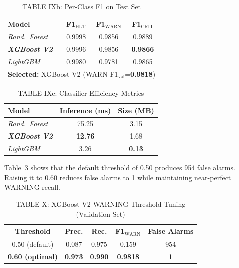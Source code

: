 \documentclass[conference]{IEEEtran}
\begin{document}
\begin{table}[htbp]
\caption{TABLE IXb: Per-Class F1 on Test Set}
\centering
\begin{tabular}{lccc}
\hline
\textbf{Model} & \textbf{F1$_\text{HLT}$} & \textbf{F1$_\text{WARN}$} & \textbf{F1$_\text{CRIT}$} \\
\hline
\textit{Rand.\ Forest}        & 0.9998 & 0.9856 & 0.9889 \\
\textbf{\textit{XGBoost V2}}  & 0.9996 & 0.9856 & \textbf{0.9866} \\
\textit{LightGBM}             & 0.9980 & 0.9781 & 0.9865 \\
\hline
\multicolumn{4}{l}{\textbf{Selected:} XGBoost V2 (WARN F1$_\text{val}$=\textbf{0.9818})} \\
\hline
\end{tabular}
\label{tab:clf_results_b}
\end{table}

\begin{table}[htbp]
\caption{TABLE IXc: Classifier Efficiency Metrics}
\centering
\begin{tabular}{lcc}
\hline
\textbf{Model} & \textbf{Inference (ms)} & \textbf{Size (MB)} \\
\hline
\textit{Rand.\ Forest}        & 75.25          & 3.15 \\
\textbf{\textit{XGBoost V2}}  & \textbf{12.76} & 1.68 \\
\textit{LightGBM}             & 3.26           & \textbf{0.13} \\
\hline
\end{tabular}
\label{tab:clf_results_c}
\end{table}

Table~\ref{tab:threshold} shows that the default threshold of 0.50 produces
954 false alarms. Raising it to 0.60 reduces false alarms to 1 while
maintaining near-perfect WARNING recall.

\begin{table}[htbp]
\caption{TABLE X: XGBoost V2 WARNING Threshold Tuning (Validation Set)}
\centering
\begin{tabular}{ccccc}
\hline
\textbf{Threshold} & \textbf{Prec.} & \textbf{Rec.} & \textbf{F1$_\text{WARN}$} & \textbf{False Alarms} \\
\hline
0.50 (default)          & 0.087          & 0.975          & 0.159           & 954 \\
\textbf{0.60 (optimal)} & \textbf{0.973} & \textbf{0.990} & \textbf{0.9818} & \textbf{1} \\
\hline
\end{tabular}
\label{tab:threshold}
\end{table}
\end{document}

